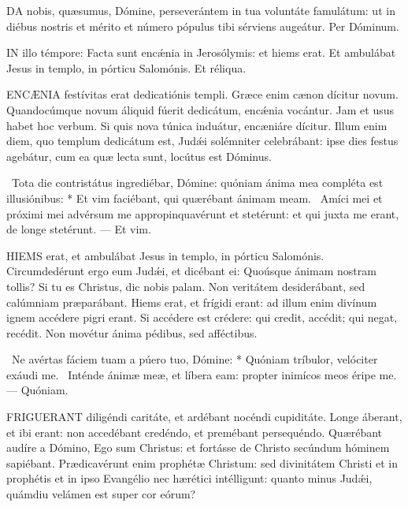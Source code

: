 
\lettrine[lines=2]{D}{A} nobis, quæsumus, Dómine, perseverántem in tua voluntáte famulátum: ut in diébus nostris et mérito et número pópulus tibi sérviens augeátur. Per Dóminum.

\sectionornament




\lettrine[lines=2]{I}{N} illo témpore: Facta sunt encǽnia in Jerosólymis: et hiems erat. Et ambulábat Jesus in templo, in pórticu Salomónis. Et réliqua.



\lettrine[lines=2]{E}{NCÆNIA} festívitas erat dedicatiónis templi. Græce enim cænon dícitur novum. Quandocúmque novum áliquid fúerit dedicátum, encǽnia vocántur. Jam et usus habet hoc verbum. Si quis nova túnica induátur, encæniáre dícitur. Illum enim diem, quo templum dedicátum est, Judǽi solémniter celebrábant: ipse dies festus agebátur, cum ea quæ lecta sunt, locútus est Dóminus.

\R\ Tota die contristátus ingrediébar, Dómine: quóniam ánima mea compléta est illusiónibus: * Et vim faciébant, qui quærébant ánimam meam. \V\ Amíci mei et próximi mei advérsum me appropinquavérunt et stetérunt: et qui juxta me erant, de longe stetérunt. --- Et vim.


\lettrine[lines=2]{H}{IEMS} erat, et ambulábat Jesus in templo, in pórticu Salomónis. Circumdedérunt ergo eum Judǽi, et dicébant ei: Quoúsque ánimam nostram tollis? Si tu es Christus, dic nobis palam. Non veritátem desiderábant, sed calúmniam præparábant. Hiems erat, et frígidi erant: ad illum enim divínum ignem accédere pigri erant. Si accédere est crédere: qui credit, accédit; qui negat, recédit. Non movétur ánima pédibus, sed afféctibus.

\R\ Ne avértas fáciem tuam a púero tuo, Dómine: * Quóniam tríbulor, velóciter exáudi me. \V\ Inténde ánimæ meæ, et líbera eam: propter inimícos meos éripe me. --- Quóniam.


\lettrine[lines=2]{F}{RIGUERANT} diligéndi caritáte, et ardébant nocéndi cupiditáte. Longe áberant, et ibi erant: non accedébant credéndo, et premébant persequéndo. Quærébant audíre a Dómino, Ego sum Christus: et fortásse de Christo secúndum hóminem sapiébant. Prædicavérunt enim prophétæ Christum: sed divinitátem Christi et in prophétis et in ipso Evangélio nec hærétici intélligunt: quanto minus Judǽi, quámdiu velámen est super cor eórum?

